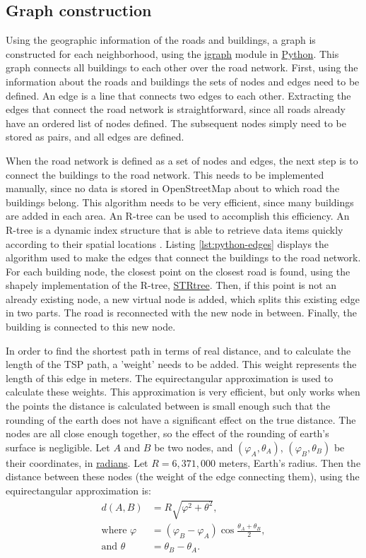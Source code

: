 \subsection{Graph construction}
Using the geographic information of the roads and buildings, a graph
is constructed for each neighborhood, using the \url{igraph} module in \url{Python}. This graph
connects all buildings to each other over the road network. First, using the information about the
roads and buildings the sets of nodes and edges need to be defined. An edge is a line that connects
two edges to each other. Extracting the edges that connect the road network is straightforward,
since all roads already have an ordered list of nodes defined. The subsequent nodes simply need to
be stored as pairs, and all edges are defined.

When the road network is defined as a set of nodes and edges, the next step is to connect the buildings
to the road network. This needs to be implemented manually, since no data is stored in OpenStreetMap
about to which road the buildings belong. This algorithm needs to be very efficient, since many
buildings are added in each area. An R-tree can be used to accomplish this efficiency.
An R-tree is a dynamic index structure that is able to retrieve data items quickly according to
their spatial locations \citep{guttman1984r}. Listing \ref{lst:python-edges} displays the algorithm
used to make the edges that connect the buildings to the road network. For each building node,
the closest point on the closest road is found, using the shapely implementation of the R-tree,
\url{STRtree}. Then, if this point is not an already existing node, a new virtual node is added,
which splits this existing edge in two parts. The road is reconnected with the new node in between.
Finally, the building is connected to this new node.

In order to find the shortest path in terms of real distance, and to calculate the length of the
TSP path, a 'weight' needs to be added. This weight represents the length of this edge in meters.
The equirectangular approximation is used to calculate these weights. This approximation is very
efficient, but only works when the points the distance is calculated between is small enough such
that the rounding of the earth does not have a significant effect on the true distance.
The nodes are all close enough together, so the effect of the
rounding of earth's surface is negligible. Let $A$ and $B$ be two nodes,
and $(\varphi_A,\theta_A)$, $(\varphi_B,\theta_B)$ be their coordinates, in \url{radians}. Let $R=6,371,000$ meters,
Earth's radius. Then the distance between these nodes (the weight of the edge connecting them),
using the equirectangular approximation is:
\begin{align}
	\label{eq:equirectangluar_approx}
	d(A,B)               & =R\sqrt{\varphi^2+\theta^2},                             \\
	\text{where }\varphi & =(\varphi_B-\varphi_A)\cos{\frac{\theta_A+\theta_B}{2}}, \\
	\text{and }\theta    & =\theta_B-\theta_A.
\end{align}

